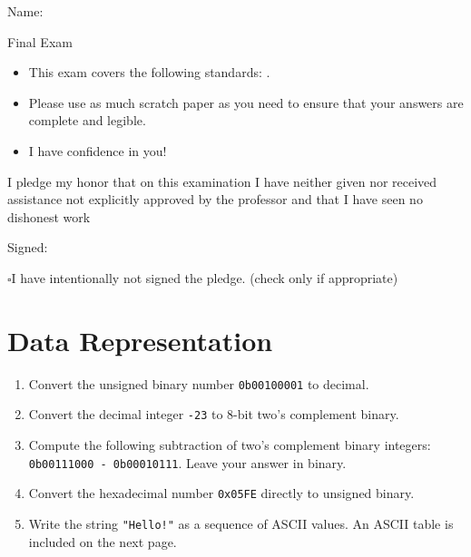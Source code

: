 \documentclass[12pt]{article}
\begin{document}
Name: \makebox[3in]{\hrulefill
\hrulefill}

\vfill

\begin{center}
{\huge Final Exam}
\end{center}

\begin{itemize}

    \item This exam covers the following standards: %
    .
    \item Please use as much scratch paper as you need to ensure that your answers are complete and legible.
    \item I have confidence in you!
\end{itemize}

\vfill

I pledge my honor that on this examination I have neither given nor received assistance not explicitly approved by the professor and that I have seen no dishonest work 

\hfill Signed: \makebox[3in]{\hrulefill}

$\square$\quad I have intentionally not signed the pledge. (check only if appropriate)
\newpage


\section*{Data Representation}

\begin{enumerate}
\item Convert the unsigned binary number \texttt{0b00100001} to decimal.
\vfill

\item Convert the decimal integer \texttt{-23} to 8-bit two's complement binary.
\vfill

\item Compute the following subtraction of two's complement binary integers: \texttt{0b00111000 - 0b00010111}. Leave your answer in binary.
\vfill

\item Convert the hexadecimal number \texttt{0x05FE} directly to unsigned binary.
\vfill

\item Write the string \texttt{"Hello!"} as a sequence of ASCII values. An ASCII table is included on the next page.
\vfill
\end{enumerate}
\end{document}
